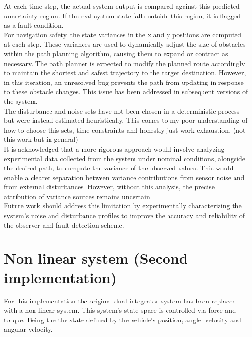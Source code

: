 \documentclass[12pt]{article}
\begin{document}
At each time step, the actual system output is compared against this predicted uncertainty region. 
If the real system state falls outside this region, it is flagged as a fault condition.\\

For navigation safety, the state variances in the x and y positions are computed at each step. 
These variances are used to dynamically adjust the size of obstacles within the path planning algorithm, 
causing them to expand or contract as necessary. The path planner is expected to modify the planned route 
accordingly to maintain the shortest and safest trajectory to the target destination. However, in this iteration, 
an unresolved bug prevents the path from updating in response to these obstacle changes. This 
issue has been addressed in subsequent versions of the system.\\

The disturbance and noise sets have not been chosen in a deterministic process but were instead estimated heuristically. 
This comes to my poor understanding of how to choose this sets, time constraints and honestly just work exhaustion. 
(not this work but in general)\\

It is acknowledged that a more rigorous approach would involve analyzing experimental 
data collected from the system under nominal conditions, alongside the desired path, to compute 
the variance of the observed values. This would enable a clearer separation between variance 
contributions from sensor noise and from external disturbances. However, without this analysis,
the precise attribution of variance sources remains uncertain.\\

Future work should address this limitation by experimentally characterizing the system's noise and 
disturbance profiles to improve the accuracy and reliability of the observer and fault detection scheme.

\section{Non linear system (Second implementation)}

For this implementation the original dual integrator system has been replaced with a non linear system.
This system's state space is controlled via force and torque. Being the the state defined by the vehicle's position,
angle, velocity and angular velocity.
\end{document}
